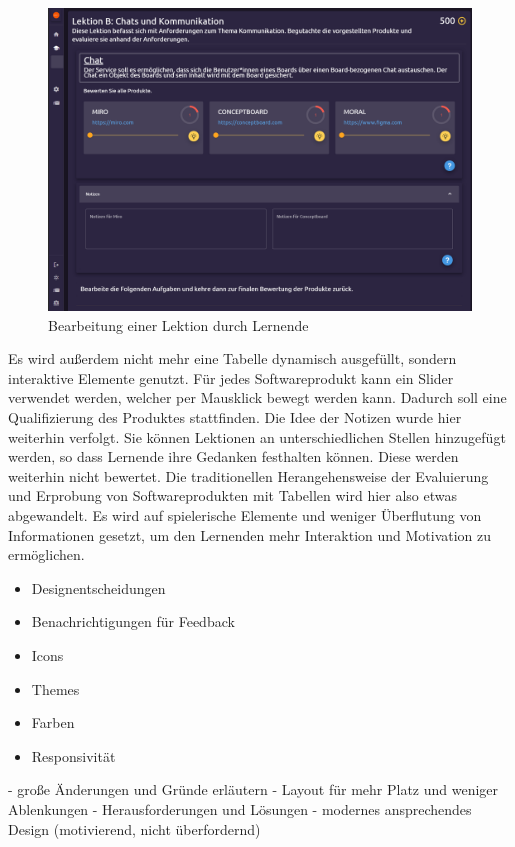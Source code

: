 \begin{figure}[H]
    \centering
    \includegraphics[width=1.0\textwidth]{assets/screenshots/finale_gui/Lektion_Lernende_1.png}
    \caption{Bearbeitung einer Lektion durch Lernende}
    \label{fig:student_lesson_1_gui}
\end{figure}

Es wird außerdem nicht mehr eine Tabelle dynamisch ausgefüllt, sondern interaktive Elemente genutzt. Für jedes Softwareprodukt kann ein Slider verwendet werden, welcher per Mausklick bewegt werden kann. Dadurch soll eine Qualifizierung des Produktes stattfinden. 
Die Idee der Notizen wurde hier weiterhin verfolgt. Sie können Lektionen an unterschiedlichen Stellen hinzugefügt werden, so dass Lernende ihre Gedanken festhalten können. Diese werden weiterhin nicht bewertet. 
Die traditionellen Herangehensweise der Evaluierung und Erprobung von Softwareprodukten mit Tabellen wird hier also etwas abgewandelt. Es wird auf spielerische Elemente und weniger Überflutung von Informationen gesetzt, um den Lernenden mehr Interaktion und Motivation zu ermöglichen.
       
\begin{itemize}
    \item Designentscheidungen
    \item Benachrichtigungen für Feedback
    \item Icons
    \item Themes
    \item Farben
    \item Responsivität
\end{itemize}
- große Änderungen und Gründe erläutern
- Layout für mehr Platz und weniger Ablenkungen
- Herausforderungen und Lösungen
- modernes ansprechendes Design (motivierend, nicht überfordernd)   
